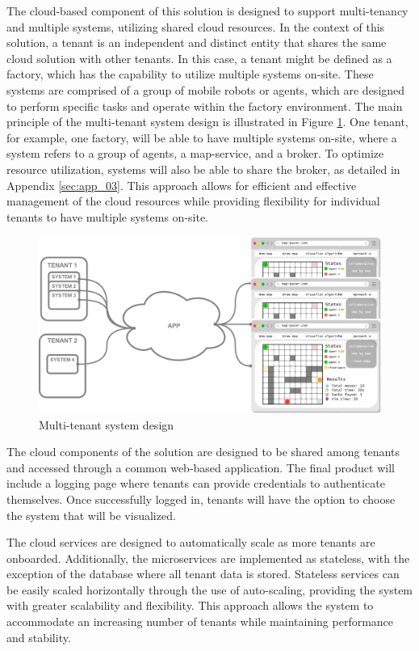 The cloud-based component of this solution is designed to support multi-tenancy and multiple systems, utilizing shared cloud resources.  In the context of this solution, a tenant is an independent and distinct entity that shares the same cloud solution with other tenants. In this case, a tenant might be  defined as a factory, which has the capability to utilize multiple systems on-site. These systems are comprised of a group of mobile robots or agents, which are designed to perform specific tasks and operate within the factory environment. The main principle of the multi-tenant system design is illustrated in Figure \ref{fig:multi_tenant_simple}. One tenant, for example, one factory, will be able to have multiple systems on-site, where a system refers to a group of agents, a map-service, and a broker. To optimize resource utilization, systems will also be able to share the broker, as detailed in Appendix \ref{sec:app_03}. This approach allows for efficient and effective management of the cloud resources while providing flexibility for individual tenants to have multiple systems on-site.

\begin{figure}[H]
    \centering
    \includegraphics[width=\textwidth]{pictures/multi_tenant_simple.png}
    \caption{ Multi-tenant system design }
    \label{fig:multi_tenant_simple}
\end{figure}

The cloud components of the solution are designed to be shared among tenants and accessed through a common web-based application. The final product will include a logging page where tenants can provide credentials to authenticate themselves. Once successfully logged in, tenants will have the option to choose the system that will be visualized.

The cloud services are designed to automatically scale as more tenants are onboarded. Additionally, the microservices are implemented as stateless, with the exception of the database where all tenant data is stored. Stateless services can be easily scaled horizontally through the use of auto-scaling, providing the system with greater scalability and flexibility. This approach allows the system to accommodate an increasing number of tenants while maintaining performance and stability.